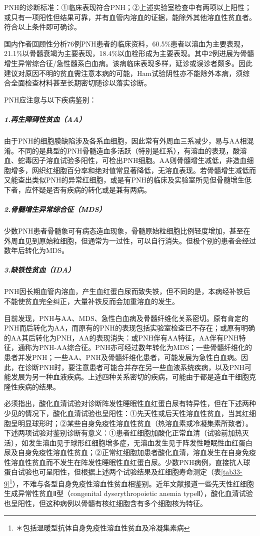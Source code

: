 PNH的诊断标准：①临床表现符合PNH；②上述实验室检查中有两项以上阳性；或只有一项阳性但结果可靠，并有血管内溶血的证据，能除外其他溶血性贫血者。符合以上条件即可确诊。

国内作者回顾性分析76例PNH患者的临床资料，60.5\%患者以溶血为主要表现，21.1\%以骨髓衰竭为主要表现，18.4\%以血栓形成为主要表现。其中2例进展为骨髓增生异常综合征/急性髓系白血病。该病临床表现多样，延诊或误诊者颇多。因此建议对原因不明的贫血需注意本病的可能，Ham试验阴性亦不能除外本病，须综合全面检查材料甚至长期密切随诊以落实诊断。

PNH应注意与以下疾病鉴别：

\subparagraph{1.再生障碍性贫血（AA）}

由于PNH的细胞膜缺陷涉及各系血细胞，因此常有外周血三系减少，易与AA相混淆。不同的是典型的PNH骨髓造血多活跃（特别是红系），有溶血的表现，酸溶血、蛇毒因子溶血试验多阳性，可检出PNH细胞。AA则骨髓增生减低，非造血细胞增多，网织红细胞百分率和绝对值常显著降低，无溶血表现。若骨髓增生减低而又能查出类似PNH的异常红细胞，或是有PNH的临床及实验室所见但骨髓增生低下者，应怀疑是否有疾病的转化或是兼有两病。

\subparagraph{2.骨髓增生异常综合征（MDS）}

少数PNH患者骨髓象可有病态造血现象，骨髓原始粒细胞比例轻度增加，甚至在外周血见到原始粒细胞，但通常为一过性，可以自行消失。但极个别的患者会经过数年后转化为MDS。

\subparagraph{3.缺铁性贫血（IDA）}

PNH因长期血管内溶血，产生血红蛋白尿而致失铁，但不同的是，本病经补铁后不能使贫血完全纠正，大量补铁反而会加重溶血的发生。

目前发现，PNH与AA、MDS、急性白血病及骨髓纤维化关系密切。原有肯定的PNH而后转化为AA，而原有的PNH的表现包括实验室检查已不存在；或原有明确的AA其后转化为PNH，AA的表现消失：或PNH伴有AA特征，AA伴有PNH特征，通称为PNH-AA综合征。PNH亦可经过数年转化为MDS；一些骨髓纤维化的患者并发PNH；一些AA、PNH及骨髓纤维化患者，可能发展为急性白血病。因此，在诊断PNH时，要注意患者可能合并存在另一些血液系统疾病，以及PNH可能发展为另一种血液疾病。上述四种关系密切的疾病，可能由于都是造血干细胞克隆性疾病的结果。

必须指出，酸化血清试验对诊断阵发性睡眠性血红蛋白尿有特异性，但在下述两种少见的情况下，酸化血清试验也呈阳性：①先天性或后天性溶血性贫血，当其红细胞呈明显球形时；②某些自身免疫性溶血性贫血（热溶血素或冷凝集素所致者）。下述两项试验对鉴别诊断有意义：①患者红细胞加酸化正常血清（试验前加热灭活），如发生溶血见于球形红细胞增多症，无溶血发生见于阵发性睡眠性血红蛋白尿及自身免疫性溶血性贫血；②正常红细胞加患者酸化血清，溶血发生在自身免疫性溶血性贫血而不发生在阵发性睡眠性血红蛋白尿。少数PNH病例，直接抗人球蛋白试验也可呈阳性，但根据上述两个试验结果及红细胞寿命测定（表\ref{tab33-9}\footnote{＊包括温暖型抗体自身免疫性溶血性贫血及冷凝集素病}），不难与各型自身免疫性溶血性贫血相鉴别。近年文献报道一些先天性红细胞生成异常性贫血Ⅱ型（congenital
dyserythropoietic anemia
typeⅡ），酸化血清试验也呈阳性，但这种病例以骨髓有核红细胞含有多个细胞核为特征。

